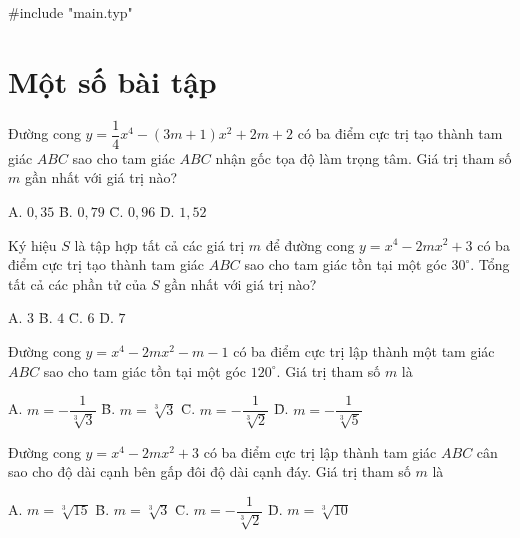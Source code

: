 #include "main.typ"
\section{Một số bài tập}
 Đường cong $y = \dfrac{1}{4}x^4 - (3m+1)x^2 + 2m + 2$ có ba điểm cực trị tạo thành tam giác $ABC$ sao cho tam giác $ABC$ nhận gốc tọa độ làm trọng tâm. Giá trị tham số $m$ gần nhất với giá trị nào?
\begin{tabbing}
A. $0,35$ \qquad\qquad \= B. $0,79$ \qquad\qquad \= C. $0,96$ \qquad\qquad \= D. $1,52$
\end{tabbing}

\vspace{0.3cm}

 Ký hiệu $S$ là tập hợp tất cả các giá trị $m$ để đường cong $y = x^4 - 2mx^2 + 3$ có ba điểm cực trị tạo thành tam giác $ABC$ sao cho tam giác tồn tại một góc $30^\circ$. Tổng tất cả các phần tử của $S$ gần nhất với giá trị nào?
\begin{tabbing}
A. $3$ \qquad\qquad\qquad \= B. $4$ \qquad\qquad\qquad \= C. $6$ \qquad\qquad\qquad \= D. $7$
\end{tabbing}

\vspace{0.3cm}

 Đường cong $y = x^4 - 2mx^2 - m - 1$ có ba điểm cực trị lập thành một tam giác $ABC$ sao cho tam giác tồn tại một góc $120^\circ$. Giá trị tham số $m$ là
\begin{tabbing}
A. $m = -\dfrac{1}{\sqrt[3]{3}}$ \qquad \= B. $m = \sqrt[3]{3}$ \qquad\qquad \= C. $m = -\dfrac{1}{\sqrt[3]{2}}$ \qquad \= D. $m = -\dfrac{1}{\sqrt[3]{5}}$
\end{tabbing}

\vspace{0.3cm}

 Đường cong $y = x^4 - 2mx^2 + 3$ có ba điểm cực trị lập thành tam giác $ABC$ cân sao cho độ dài cạnh bên gấp đôi độ dài cạnh đáy. Giá trị tham số $m$ là
\begin{tabbing}
A. $m = \sqrt[3]{15}$ \qquad\quad \= B. $m = \sqrt[3]{3}$ \qquad\qquad \= C. $m = -\dfrac{1}{\sqrt[3]{2}}$ \qquad \= D. $m = \sqrt[3]{10}$
\end{tabbing}

